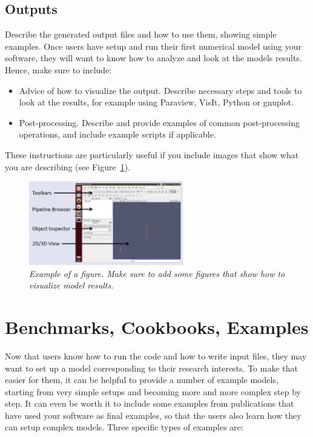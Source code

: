 \documentclass{article}
\begin{document}
\subsection{Outputs} Describe the generated output files and how to use them, showing simple examples. Once users have setup and run their first numerical model using your software, they will want to know how to analyze and look at the models results. Hence, make sure to include:
\begin{itemize}
\item Advice of how to visualize the output. Describe necessary steps and tools to look at the results, for example using Paraview, VisIt, Python or gnuplot. 
\item Post-processing. Describe and provide examples of common post-processing operations, and include example scripts if applicable.
\end{itemize}

These instructions are particularly useful if you include images that show what you are describing (see Figure~\ref{fig:paraview}).

\begin{figure}[tbp]
  \centering
  \includegraphics[width=0.6\textwidth]{paraview.png}
  \caption{\it Example of a figure. Make sure to add some figures that show how to visualize model results.}
  \label{fig:paraview}
\end{figure}

\section{Benchmarks, Cookbooks, Examples}

Now that users know how to run the code and how to write input files, 
they may want to set up a model corresponding to their research interests. 
To make that easier for them, it can be helpful to provide a number of example models, starting from very simple setups and becoming more and more complex step by step. It can even be worth it to include some examples from publications that have used your software as final examples, so that the users also learn how they can setup complex models. 
Three specific types of examples are:
\end{document}
